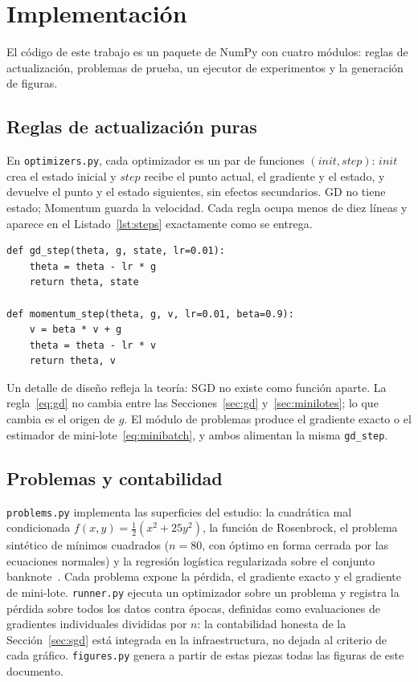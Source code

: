 \section{Implementación}\label{sec:impl}

El código de este trabajo es un paquete de NumPy con cuatro módulos: reglas de actualización, problemas de prueba, un ejecutor de experimentos y la generación de figuras.

\subsection{Reglas de actualización puras}

En \texttt{optimizers.py}, cada optimizador es un par de funciones $(\mathit{init}, \mathit{step})$: $\mathit{init}$ crea el estado inicial y $\mathit{step}$ recibe el punto actual, el gradiente y el estado, y devuelve el punto y el estado siguientes, sin efectos secundarios. GD no tiene estado; Momentum guarda la velocidad. Cada regla ocupa menos de diez líneas y aparece en el Listado~\ref{lst:steps} exactamente como se entrega.

\begin{lstlisting}[float=t, caption={Las reglas de actualización \eqref{eq:gd} y \eqref{eq:momentum-v}--\eqref{eq:momentum-theta} en \texttt{optimizers.py}.}, label={lst:steps}]
def gd_step(theta, g, state, lr=0.01):
    theta = theta - lr * g
    return theta, state

def momentum_step(theta, g, v, lr=0.01, beta=0.9):
    v = beta * v + g
    theta = theta - lr * v
    return theta, v
\end{lstlisting}

Un detalle de diseño refleja la teoría: SGD no existe como función aparte. La regla~\eqref{eq:gd} no cambia entre las Secciones~\ref{sec:gd} y~\ref{sec:minilotes}; lo que cambia es el origen de $g$. El módulo de problemas produce el gradiente exacto o el estimador de mini-lote~\eqref{eq:minibatch}, y ambos alimentan la misma \texttt{gd\_step}.

\subsection{Problemas y contabilidad}

\texttt{problems.py} implementa las superficies del estudio: la cuadrática mal condicionada $f(x,y) = \frac{1}{2}(x^2 + 25y^2)$, la función de Rosenbrock, el problema sintético de mínimos cuadrados ($n = 80$, con óptimo en forma cerrada por las ecuaciones normales) y la regresión logística regularizada sobre el conjunto banknote~\cite{lohweg2013}. Cada problema expone la pérdida, el gradiente exacto y el gradiente de mini-lote. \texttt{runner.py} ejecuta un optimizador sobre un problema y registra la pérdida sobre todos los datos contra épocas, definidas como evaluaciones de gradientes individuales divididas por $n$: la contabilidad honesta de la Sección~\ref{sec:sgd} está integrada en la infraestructura, no dejada al criterio de cada gráfico. \texttt{figures.py} genera a partir de estas piezas todas las figuras de este documento.

